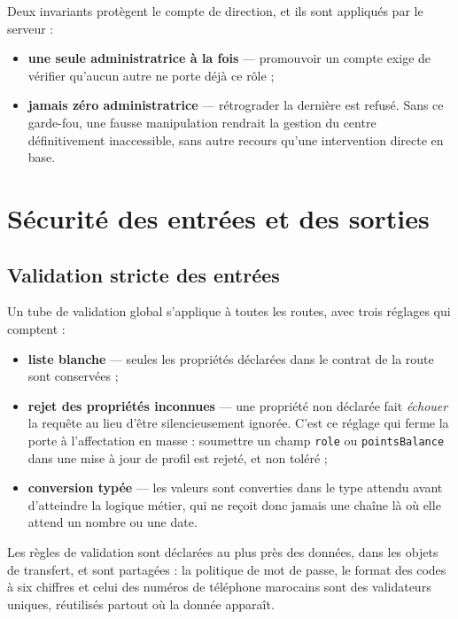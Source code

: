 Deux invariants protègent le compte de direction, et ils sont appliqués par le
serveur :

\begin{itemize}[leftmargin=1.2cm]
  \item \textbf{une seule administratrice à la fois} --- promouvoir un compte
  exige de vérifier qu'aucun autre ne porte déjà ce rôle ;
  \item \textbf{jamais zéro administratrice} --- rétrograder la dernière est
  refusé. Sans ce garde-fou, une fausse manipulation rendrait la gestion du
  centre définitivement inaccessible, sans autre recours qu'une intervention
  directe en base.
\end{itemize}

\section{Sécurité des entrées et des sorties}

\subsection{Validation stricte des entrées}

Un tube de validation global s'applique à toutes les routes, avec trois
réglages qui comptent :

\begin{itemize}[leftmargin=1.2cm]
  \item \textbf{liste blanche} --- seules les propriétés déclarées dans le
  contrat de la route sont conservées ;
  \item \textbf{rejet des propriétés inconnues} --- une propriété non déclarée
  fait \emph{échouer} la requête au lieu d'être silencieusement ignorée. C'est
  ce réglage qui ferme la porte à l'affectation en masse : soumettre un champ
  \texttt{role} ou \texttt{pointsBalance} dans une mise à jour de profil est
  rejeté, et non toléré ;
  \item \textbf{conversion typée} --- les valeurs sont converties dans le type
  attendu avant d'atteindre la logique métier, qui ne reçoit donc jamais une
  chaîne là où elle attend un nombre ou une date.
\end{itemize}

Les règles de validation sont déclarées au plus près des données, dans les
objets de transfert, et sont partagées : la politique de mot de passe, le
format des codes à six chiffres et celui des numéros de téléphone marocains
sont des validateurs uniques, réutilisés partout où la donnée apparaît.

